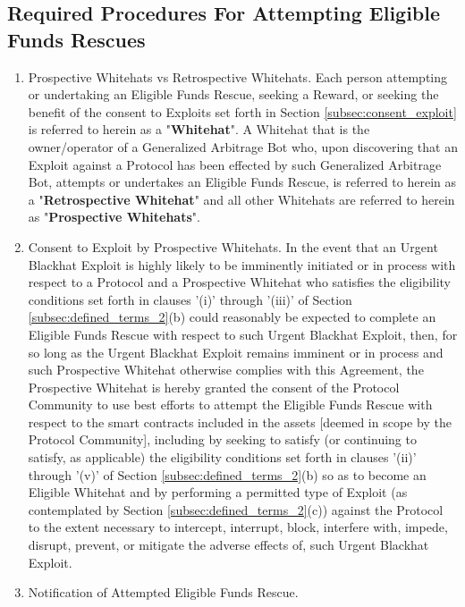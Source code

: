 \documentclass{article}
\begin{document}
\subsection{Required Procedures For Attempting Eligible Funds Rescues}\label{sec:req_procedure_rescue}

\begin{enumerate}
    \item Prospective Whitehats vs Retrospective Whitehats. Each person attempting or undertaking an Eligible Funds Rescue, seeking a Reward, or seeking the benefit of the consent to Exploits set forth in Section \ref{subsec:consent_exploit} is referred to herein as a "\textbf{Whitehat}". A Whitehat that is the owner/operator of a Generalized Arbitrage Bot who, upon discovering that an Exploit against a Protocol has been effected by such Generalized Arbitrage Bot, attempts or undertakes an Eligible Funds Rescue, is referred to herein as a "\textbf{Retrospective Whitehat}" and all other Whitehats are referred to herein as "\textbf{Prospective Whitehats}".

    \item Consent to Exploit by Prospective Whitehats.\label{subsec:consent_exploit} In the event that an Urgent Blackhat Exploit is highly likely to be imminently initiated or in process with respect to a Protocol and a Prospective Whitehat who satisfies the eligibility conditions set forth in clauses '(i)' through '(iii)' of Section \ref{subsec:defined_terms_2}(b) could reasonably be expected to complete an Eligible Funds Rescue with respect to such Urgent Blackhat Exploit, then, for so long as the Urgent Blackhat Exploit remains imminent or in process and such Prospective Whitehat otherwise complies with this Agreement, the Prospective Whitehat is hereby granted the consent of the Protocol Community to use best efforts to attempt the Eligible Funds Rescue with respect to the smart contracts included in the assets [deemed in scope by the Protocol Community], including by seeking to satisfy (or continuing to satisfy, as applicable) the eligibility conditions set forth in clauses '(ii)' through '(v)' of Section \ref{subsec:defined_terms_2}(b) so as to become an Eligible Whitehat and by performing a permitted type of Exploit (as contemplated by Section \ref{subsec:defined_terms_2}(c)) against the Protocol to the extent necessary to intercept, interrupt, block, interfere with, impede, disrupt, prevent, or mitigate the adverse effects of, such Urgent Blackhat Exploit.

    \item Notification of Attempted Eligible Funds Rescue.\label{subsec:notification_attempted_rescue}


\end{enumerate}
\end{document}
